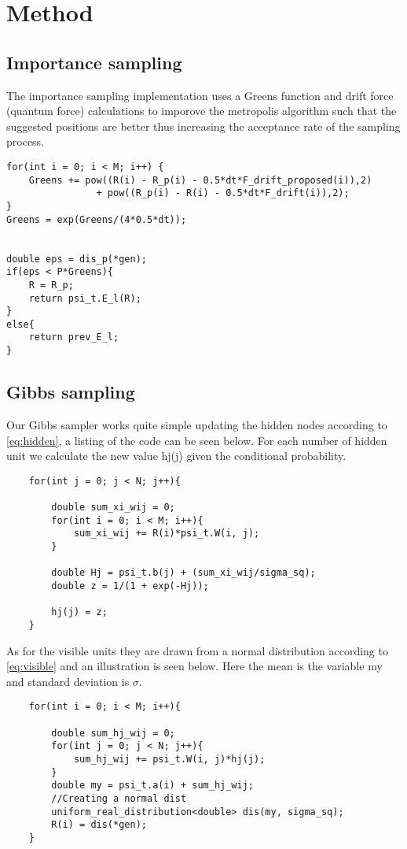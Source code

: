 \section{Method}
\subsection{Importance sampling}
The importance sampling implementation uses a Greens function and drift force (quantum force)
calculations to imporove the metropolis algorithm such that the suggested positions
are better thus increasing the acceptance rate of the sampling process.
\begin{lstlisting}
for(int i = 0; i < M; i++) {
	Greens += pow((R(i) - R_p(i) - 0.5*dt*F_drift_proposed(i)),2)
				+ pow((R_p(i) - R(i) - 0.5*dt*F_drift(i)),2);
}
Greens = exp(Greens/(4*0.5*dt));


double eps = dis_p(*gen);
if(eps < P*Greens){
	R = R_p;
	return psi_t.E_l(R);
}
else{
	return prev_E_l;
}
\end{lstlisting}

\subsection{Gibbs sampling}

Our Gibbs sampler works quite simple updating the hidden nodes according to \eqref{eq:hidden}, a listing of the code can be seen below. For each number of hidden unit we calculate the new value hj(j) given the conditional probability.

\begin{lstlisting}
    for(int j = 0; j < N; j++){

        double sum_xi_wij = 0;
        for(int i = 0; i < M; i++){
            sum_xi_wij += R(i)*psi_t.W(i, j);
        }

        double Hj = psi_t.b(j) + (sum_xi_wij/sigma_sq);
        double z = 1/(1 + exp(-Hj));

        hj(j) = z;
    }
\end{lstlisting}

As for the visible units they are drawn from a normal distribution according to \eqref{eq:visible} and an illustration is seen below. Here the mean is the variable my and standard deviation is $\sigma$.


\begin{lstlisting}
    for(int i = 0; i < M; i++){

        double sum_hj_wij = 0;
        for(int j = 0; j < N; j++){
            sum_hj_wij += psi_t.W(i, j)*hj(j);
        }
        double my = psi_t.a(i) + sum_hj_wij;
        //Creating a normal dist
        uniform_real_distribution<double> dis(my, sigma_sq);
        R(i) = dis(*gen);
    }
\end{lstlisting}

